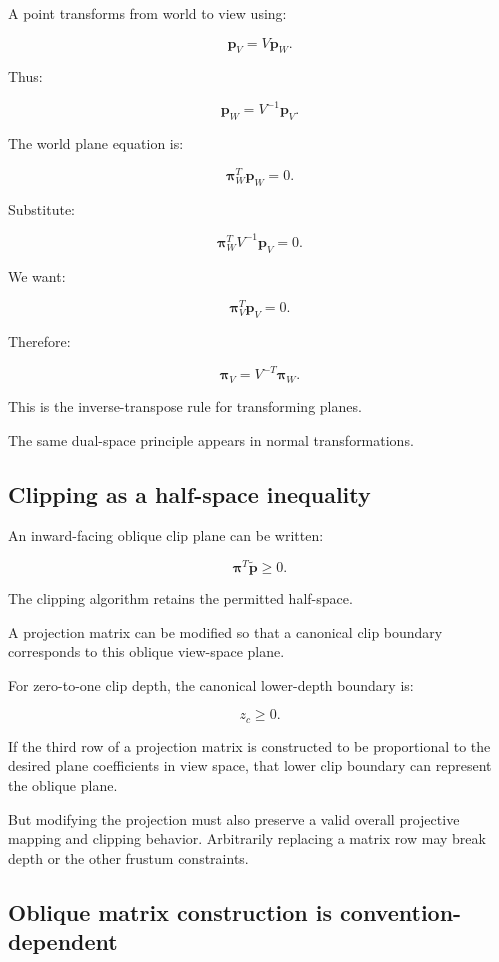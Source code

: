 A point transforms from world to view using:

\[
 \mathbf p_V=V\mathbf p_W.
\]

Thus:

\[
 \mathbf p_W=V^{-1}\mathbf p_V.
\]

The world plane equation is:

\[
 \boldsymbol\pi_W^T\mathbf p_W=0.
\]

Substitute:

\[
 \boldsymbol\pi_W^TV^{-1}\mathbf p_V=0.
\]

We want:

\[
 \boldsymbol\pi_V^T\mathbf p_V=0.
\]

Therefore:

\[
 \boxed{ \boldsymbol\pi_V=V^{-T}\boldsymbol\pi_W }.
\]

This is the inverse-transpose rule for transforming planes.

The same dual-space principle appears in normal transformations.

\subsection{Clipping as a half-space inequality}\label{02-foundations-ii-ch034-clipping-as-a-half-space-inequality}

An inward-facing oblique clip plane can be written:

\[
 \boxed{ \boldsymbol\pi^T\tilde{\mathbf p}\ge0 }.
\]

The clipping algorithm retains the permitted half-space.

A projection matrix can be modified so that a canonical clip boundary corresponds to this oblique view-space plane.

For zero-to-one clip depth, the canonical lower-depth boundary is:

\[
 z_c\ge0.
\]

If the third row of a projection matrix is constructed to be proportional to the desired plane coefficients in view space, that lower clip boundary can represent the oblique plane.

But modifying the projection must also preserve a valid overall projective mapping and clipping behavior. Arbitrarily replacing a matrix row may break depth or the other frustum constraints.

\subsection{Oblique matrix construction is convention-dependent}\label{02-foundations-ii-ch034-oblique-matrix-construction-is-convention-dependent}


